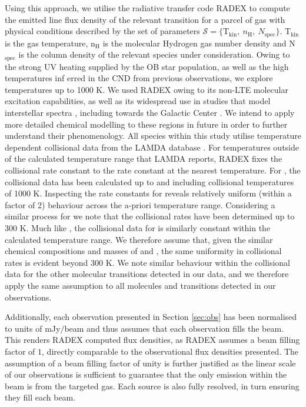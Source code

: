 \documentclass[twocolumn]{aastex631}
\begin{document}
Using this approach, we utilise the radiative transfer code RADEX \citep{radex} to compute the emitted line flux density of the relevant transition for a parcel of gas with physical conditions described by the set of parameters $\mathcal{S} = \{\mathrm{T}_{\mathrm{kin}}, \: n_{\mathrm{H}}, \: N_{\mathrm{spec}} \}$. T$_{\mathrm{kin}}$ is the gas temperature, n$_{\mathrm{H}}$ is the molecular Hydrogen gas number density and N$_{\mathrm{spec}}$ is the column density of the relevant species under consideration. Owing to the strong UV heating supplied by the OB star population, as well as the high temperatures inf erred in the CND from previous observations, we explore temperatures up to 1000 \si{\kelvin}. We used RADEX owing to its non-LTE molecular excitation capabilities, as well as its widespread use in studies that model interstellar spectra \citep[e.g.][]{chemDiversity,nonLTENO,wishWaterModelling}, including towards the Galactic Center \citep[e.g.][]{sgrB2Ammonia,sgrAPDR,sgrB2ShockedGas}. We intend to apply more detailed chemical modelling to these regions in future in order to further understand their phenomenology. All species within this study utilise temperature dependent collisional data from the LAMDA database \citep{lamda}. For temperatures outside of the calculated temperature range that LAMDA reports, RADEX fixes the collisional rate constant to the rate constant at the nearest temperature. For , the collisional data has been calculated up to and including collisional temperatures of 1000 \si{\kelvin}. Inspecting the rate constants for  reveals relatively uniform (within a factor of 2) behaviour across the a-priori temperature range. Considering a similar process for  we note that the collisional rates have been determined up to 300 \si{\kelvin}. Much like , the collisional data for  is similarly constant within the calculated temperature range. We therefore assume that, given the similar chemical compositions and masses of  and , the same uniformity in collisional rates is evident beyond 300 \si{\kelvin}. We note similar behaviour within the collisional data for the other molecular transitions detected in our data, and we therefore apply the same assumption to all molecules and transitions detected in our observations.

Additionally, each observation presented in Section \ref{sec:obs} has been normalised to units of mJy$/$beam and thus assumes that each observation fills the beam. This renders RADEX computed flux densities, as RADEX assumes a beam filling factor of $1$, directly comparable to the observational flux densities presented. The assumption of a beam filling factor of unity is further justified as the linear scale of our observations is sufficient to guarantee that the only emission within the beam is from the targeted gas. Each source is also fully resolved, in turn ensuring they fill each beam.
\end{document}
